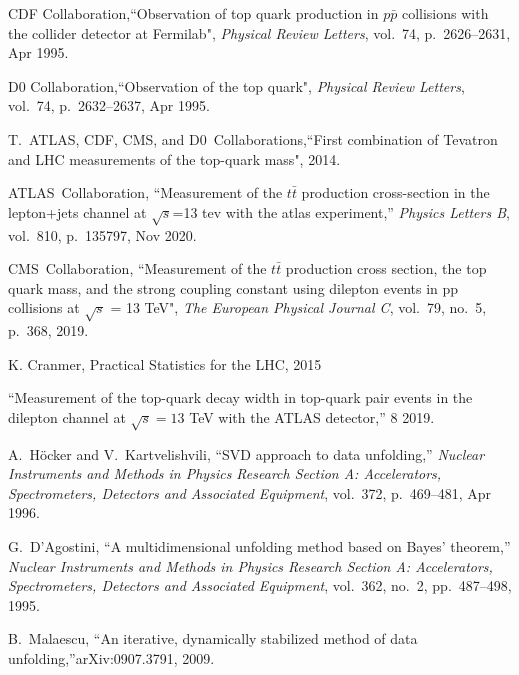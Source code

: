 \documentclass[12pt]{article}
\begin{document}
\begin{thebibliography}{99}



CDF Collaboration,``Observation of top quark production in $p\bar{p}$ collisions with the collider detector at Fermilab", {\em Physical Review Letters}, vol.~74, p.~2626–2631, Apr 1995.

D0 Collaboration,``Observation of the top quark", {\em Physical Review Letters}, vol.~74, p.~2632–2637, Apr 1995.

T.~ATLAS, CDF, CMS, and D0~Collaborations,``First combination of Tevatron and LHC measurements of the top-quark mass", 2014.

ATLAS~Collaboration, ``Measurement of the $t\bar{t}$ production cross-section in the lepton+jets channel at $\sqrt{s}$=13 tev with the atlas experiment,''
  {\em Physics Letters B}, vol.~810, p.~135797, Nov 2020.

CMS~Collaboration, ``Measurement of the $t\bar{t}$ production cross section, the top quark mass, and the strong coupling constant using dilepton events in pp collisions
  at $\sqrt{s}$ = 13 TeV", {\em The European
  Physical Journal C}, vol.~79, no.~5, p.~368, 2019.

K. Cranmer, Practical Statistics for the LHC, 2015

``{Measurement of the top-quark decay width in top-quark pair events in the
  dilepton channel at $\sqrt{s}=13$ TeV with the ATLAS detector},'' 8 2019.

A.~Höcker and V.~Kartvelishvili, ``SVD approach to data unfolding,'' {\em
  Nuclear Instruments and Methods in Physics Research Section A: Accelerators,
  Spectrometers, Detectors and Associated Equipment}, vol.~372, p.~469–481,
  Apr 1996.

G.~D'Agostini, ``A multidimensional unfolding method based on Bayes' theorem,''
  {\em Nuclear Instruments and Methods in Physics Research Section A:
  Accelerators, Spectrometers, Detectors and Associated Equipment}, vol.~362,
  no.~2, pp.~487--498, 1995.

B.~Malaescu, ``An iterative, dynamically stabilized method of data unfolding,''arXiv:0907.3791,
  2009.


\end{thebibliography}
\end{document}
